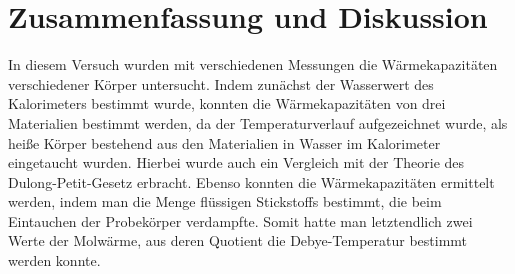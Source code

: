 \documentclass{article}
\begin{document}
\begin{table}[!h]
    \centering
    \caption{Zusammenfassung der relevanten Messgrößen für die Proben}
\end{table}

\newpage
\section{Zusammenfassung und Diskussion}

In diesem Versuch wurden mit verschiedenen Messungen die Wärmekapazitäten verschiedener Körper untersucht. Indem zunächst der Wasserwert des Kalorimeters bestimmt wurde, konnten die Wärmekapazitäten von drei Materialien bestimmt werden, da der Temperaturverlauf aufgezeichnet wurde, als heiße Körper bestehend aus den Materialien in Wasser im Kalorimeter eingetaucht wurden. Hierbei wurde auch ein Vergleich mit der Theorie des Dulong-Petit-Gesetz erbracht. Ebenso konnten die Wärmekapazitäten ermittelt werden, indem man die Menge flüssigen Stickstoffs bestimmt, die beim Eintauchen der Probekörper verdampfte. Somit hatte man letztendlich zwei Werte der Molwärme, aus deren Quotient die Debye-Temperatur bestimmt werden konnte.
\end{document}
